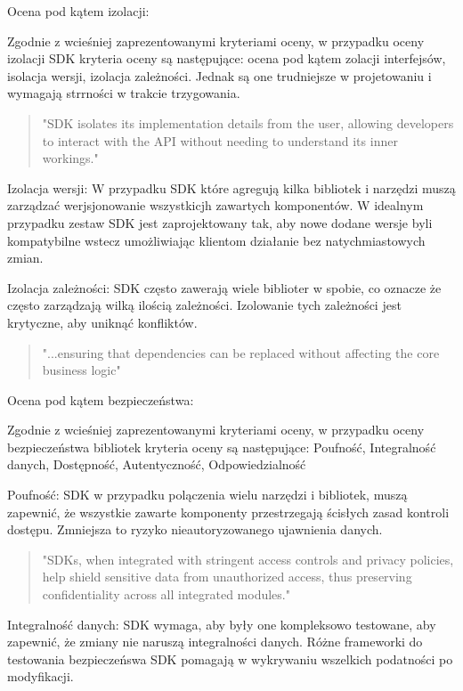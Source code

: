 \documentclass[runningheads,12pt]{llncs}
\begin{document}
Ocena pod kątem izolacji: 

Zgodnie z wcieśniej zaprezentowanymi kryteriami oceny, w przypadku oceny izolacji SDK kryteria oceny są następujące: ocena pod kątem zolacji interfejsów, isolacja wersji, izolacja zależności. Jednak są one trudniejsze w projetowaniu i wymagają strrności w trakcie trzygowania.

\begin{quote}
    "SDK isolates its implementation details from the user, allowing developers to interact with the API without needing to understand its inner workings." ~\cite[p. 75]{Essential}
\end{quote}

Izolacja wersji: W przypadku SDK które agregują kilka bibliotek i narzędzi muszą zarządzać werjsjonowanie wszystkicjh zawartych komponentów. W idealnym przypadku zestaw SDK jest zaprojektowany tak, aby nowe dodane wersje byli kompatybilne wstecz umożliwiając klientom działanie bez natychmiastowych zmian.

Izolacja zależności: SDK często zawerają wiele biblioter w spobie, co oznacze że często zarządzają wilką ilością zależności. Izolowanie tych zależności jest krytyczne, aby uniknąć konfliktów.

\begin{quote}
    "...ensuring that dependencies can be replaced without affecting the core business logic" ~\cite[p. 218]{martin2008clean}
\end{quote}

Ocena pod kątem bezpieczeństwa: 

Zgodnie z wcieśniej zaprezentowanymi kryteriami oceny, w przypadku oceny bezpieczeństwa bibliotek kryteria oceny są następujące: Poufność, Integralność danych, Dostępność, Autentyczność, Odpowiedzialność

Poufność: SDK w przypadku polączenia wielu narzędzi i bibliotek, muszą zapewnić, że wszystkie zawarte komponenty przestrzegają ścisłych zasad kontroli dostępu. Zmniejsza to ryzyko nieautoryzowanego ujawnienia danych.

\begin{quote}
    "SDKs, when integrated with stringent access controls and privacy policies, help shield sensitive data from unauthorized access, thus preserving confidentiality across all integrated modules." ~\cite[para 4]{azure2020}
\end{quote}

Integralność danych: SDK wymaga, aby były one kompleksowo testowane, aby zapewnić, że zmiany nie naruszą integralności danych. Różne frameworki do testowania bezpieczeńswa SDK pomagają w wykrywaniu wszelkich podatności po modyfikacji.
\end{document}
